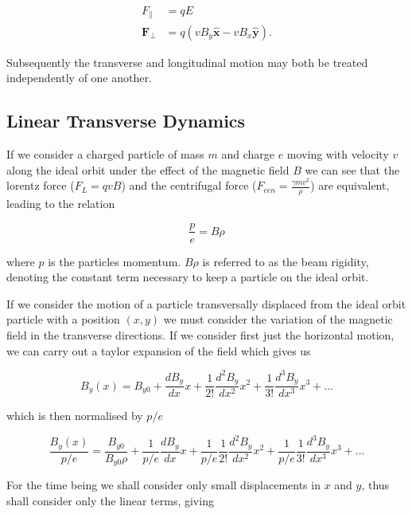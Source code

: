 \begin{align}
F_{\parallel} &= qE \\
\mathbf{F_{\perp}} &= q \left( vB_{y} \mathbf{\hat{x}} - vB_{x} \mathbf{\hat{y}} \right).
\end{align}

Subsequently the transverse and longitudinal motion may both be treated independently of one another.

\subsection{Linear Transverse Dynamics}

If we consider a charged particle of mass $m$ and charge $e$ moving with velocity $v$ along the ideal orbit under the effect of the magnetic field $B$ we can see that the lorentz force ($F_{L} = qvB$) and the centrifugal force ($F_{cen} = \frac{\gamma m v^{2}}{\rho}$) are equivalent, leading to the relation

\begin{equation}
\frac{p}{e} = B \rho
\label{eqn:beam-rigid}
\end{equation}

where $p$ is the particles momentum. $B \rho$ is referred to as the beam rigidity, denoting the constant term necessary to keep a particle on the ideal orbit. 

If we consider the motion of a particle transversally displaced from the ideal orbit particle with a position $(x, y)$ we must consider the variation of the magnetic field in the transverse directions. If we consider first just the horizontal motion, we can carry out a taylor expansion of the field which gives us

\begin{equation}
B_{y} \left( x \right) = B_{y0} + \frac{dB_{y}}{dx} x + \frac{1}{2!}\frac{d^{2}B_{y}}{dx^{2}} x^{2} + \frac{1}{3!} \frac{d^{3}B_{y}}{dx^{3}} x^{3} + ...
\end{equation}

which is then normalised by $p/e$

\begin{equation}
\frac{B_{y} \left( x \right)}{p/e} = \frac{B_{y0}}{B_{y0}\rho} + \frac{1}{p/e}\frac{dB_{y}}{dx} x + \frac{1}{p/e}\frac{1}{2!}\frac{d^{2}B_{y}}{dx^{2}} x^{2} + \frac{1}{p/e}\frac{1}{3!} \frac{d^{3}B_{y}}{dx^{3}} x^{3} + ...
\end{equation}

For the time being we shall consider only small displacements in $x$ and $y$, thus shall consider only the linear terms, giving

